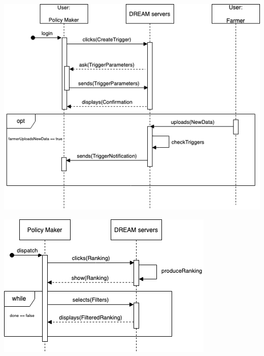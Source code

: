 \begin{center}
\includegraphics[scale=0.6]{Files/sequence_disgrams/thePNGs/policy_setTrigger.png}\\
\end{center}

\begin{center}
\includegraphics[scale=0.6]{Files/sequence_disgrams/thePNGs/policy_viewRanking.png}\\
\end{center}



%

